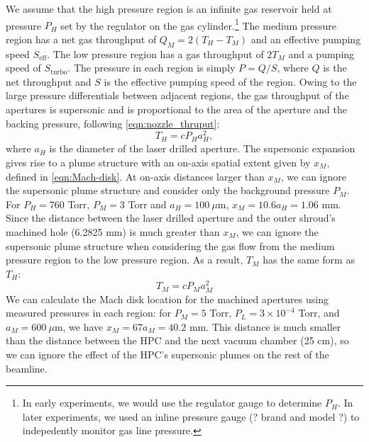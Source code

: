 \noindent\makebox[\linewidth]{\rule{\paperwidth}{0.4pt}}

We assume that the high pressure region is an infinite gas reservoir held at pressure $P_H$ set by the regulator on the gas cylinder.\footnote{In early experiments, we would use the regulator gauge to determine $P_H$. In later experiments, we used an inline pressure gauge (? brand and model ?) to indepedently monitor gas line pressure.} The medium pressure region has a net gas throughput of $Q_M = 2(T_H - T_M)$ and an effective pumping speed $S_{\textrm{eff}}$. The low pressure region has a gas throughput of $2T_M$ and a pumping speed of $S_{\textrm{turbo}}$. The pressure in each region is simply $P = Q / S$, where $Q$ is the net throughput and $S$ is the effective pumping speed of the region. Owing to the large pressure differentials between adjacent regions, the gas throughput of the apertures is supersonic and is proportional to the area of the aperture and the backing pressure, following \cref{eqn:nozzle_thruput}:
\begin{equation}
T_H = c P_H a_H^2,
\end{equation}
where $a_H$ is the diameter of the laser drilled aperture. The supersonic expansion gives rise to a plume structure with an on-axis spatial extent given by $x_M$, defined in \cref{eqn:Mach-disk}. At on-axis distances larger than $x_M$, we can ignore the supersonic plume structure and consider only the background pressure $P_M$. For $P_H = 760$ Torr, $P_M = 3$ Torr and $a_H = 100 \ \mu$m, $x_M = 10.6 a_H = 1.06$ mm. Since the distance between the laser drilled aperture and the outer shroud's machined hole (6.2825 mm) is much greater than $x_M$, we can ignore the supersonic plume structure when considering the gas flow from the medium pressure region to the low pressure region. As a result, $T_M$ has the same form as $T_H$:
\begin{equation}
T_M = c P_M a_M^2
\end{equation}
We can calculate the Mach disk location for the machined apertures using measured pressures in each region: for $P_M = 5$ Torr, $P_L = 3 \times 10^{-4}$ Torr, and $a_M = 600 \ \mu$m, we have $x_M = 67 a_M = 40.2$ mm. This distance is much smaller than the distance between the HPC and the next vacuum chamber (25 cm), so we can ignore the effect of the HPC's supersonic plumes on the rest of the beamline.

